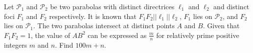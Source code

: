 Let $\mathcal{P}_1$ and $\mathcal{P}_2$ be two parabolas with distinct directrices $\ell_1$ and $\ell_2$ and distinct foci $F_1$ and $F_2$ respectively. It is known that $F_1F_2||\ell_1||\ell_2$, $F_1$ lies on $\mathcal{P}_2$, and $F_2$ lies on $\mathcal{P}_1$. The two parabolas intersect at distinct points $A$ and $B$. Given that $F_1F_2=1$, the value of $AB^2$ can be expressed as $\frac{m}{n}$ for relatively prime positive integers $m$ and $n$. Find $100m+n$.
